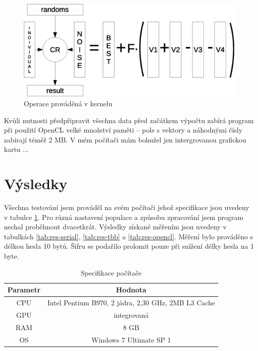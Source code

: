 \documentclass[11pt,a4paper]{scrartcl}
\begin{document}
	\begin{figure}[H]
		\centering
		\includegraphics[width=12cm]{img/opencl-data-diag}
		\caption{Operace prováděná v kernelu}
		\label{fig:kernel}
	\end{figure}

	Kvůli nutnosti předpřipravit všechna data před začátkem výpočtu zabírá program při použití OpenCL velké množství paměti -- pole s vektory a náhodnými čísly zabírají téměř 2 MB. V mém počítači mám bohužel jen intergrovanou grafickou kartu ...
	
	\section{Výsledky}
	\label{sec:results}
	Všechna testování jsem prováděl na svém počítači jehož specifikace jsou uvedeny v tabulce \ref{tab:pc-spec}. Pro různá nastavení populace a způsobu zpracování jsem program nechal proběhnout dvacetkrát. Výsledky získané měřením jsou uvedeny v tabulkách \ref{tab:res-serial}, \ref{tab:res-tbb} a \ref{tab:res-opencl}. Měření bylo prováděno s délkou hesla 10 bytů. Šifru se podařilo prolomit pouze při snížení délky hesla na 1 byte.
	
	\begin{table}[H]
		\begin{center}
			\begin{tabular}{|c|c|}
				\hline
				Parametr & Hodnota \\
				\hline
				\hline
				CPU & Intel Pentium B970, 2 jádra, 2,30 GHz, 2MB L3 Cache\\
				\hline
				GPU & integrovaná \\
				\hline
				RAM & 8 GB \\
				\hline
				OS & Windows 7 Ultimate SP 1 \\
				\hline
			\end{tabular}
		\end{center}
		\caption{Specifikace počítače}
		\label{tab:pc-spec}
	\end{table}
\end{document}
